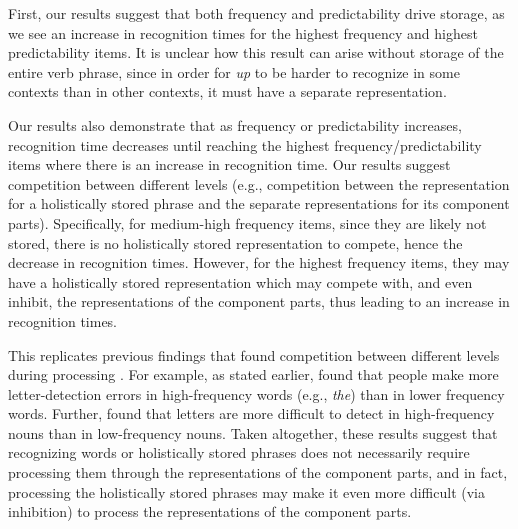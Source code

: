 \documentclass[
  authoryear,
  preprint,
  1p,
  onecolumn]{elsarticle}
\begin{document}
First, our results suggest that both frequency and predictability drive
storage, as we see an increase in recognition times for the highest
frequency and highest predictability items. It is unclear how this
result can arise without storage of the entire verb phrase, since in
order for \emph{up} to be harder to recognize in some contexts than in
other contexts, it must have a separate representation.

Our results also demonstrate that as frequency or predictability
increases, recognition time decreases until reaching the highest
frequency/predictability items where there is an increase in recognition
time. Our results suggest competition between different levels (e.g.,
competition between the representation for a holistically stored phrase
and the separate representations for its component parts). Specifically,
for medium-high frequency items, since they are likely not stored, there
is no holistically stored representation to compete, hence the decrease
in recognition times. However, for the highest frequency items, they may
have a holistically stored representation which may compete with, and
even inhibit, the representations of the component parts, thus leading
to an increase in recognition times.

This replicates previous findings that found competition between
different levels during processing
\citep[e.g.,][]{kapatsinski2009, healy1976, healy1994, minkoff2000}. For
example, as stated earlier, \citet{healy1976} found that people make
more letter-detection errors in high-frequency words (e.g., \emph{the})
than in lower frequency words. Further, \citet{minkoff2000} found that
letters are more difficult to detect in high-frequency nouns than in
low-frequency nouns. Taken altogether, these results suggest that
recognizing words or holistically stored phrases does not necessarily
require processing them through the representations of the component
parts, and in fact, processing the holistically stored phrases may make
it even more difficult (via inhibition) to process the representations
of the component parts.
\end{document}

